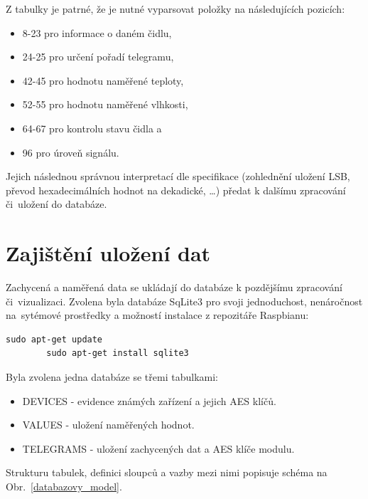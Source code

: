 Z tabulky je patrné, že je nutné vyparsovat položky na následujících pozicích:
\begin{itemize}
	\item 8-23 pro informace o daném čidlu,
	\item 24-25 pro určení pořadí telegramu,
	\item 42-45 pro hodnotu naměřené teploty,
	\item 52-55 pro hodnotu naměřené vlhkosti,
	\item 64-67 pro kontrolu stavu čidla a
	\item 96 pro úroveň signálu.	
\end{itemize}

Jejich následnou správnou interpretací dle specifikace (zohlednění uložení LSB, převod hexadecimálních hodnot na dekadické, \ldots) předat k dalšímu zpracování či~uložení do databáze.


\section{Zajištění uložení dat}
\label{SectionUlozeniDatabaze}
Zachycená a naměřená data se ukládají do databáze k pozdějšímu zpracování či~vizualizaci. Zvolena byla databáze SqLite3 pro svoji jednoduchost, nenáročnost na~sytémové prostředky a možností instalace z repozitáře Raspbianu:
 
\begin{lstlisting}[style=MyCodeBash]
		sudo apt-get update
		sudo apt-get install sqlite3
	\end{lstlisting}

Byla zvolena jedna databáze se třemi tabulkami:
\begin{itemize}
	\item DEVICES - evidence známých zařízení a jejich AES klíčů.
	\item VALUES - uložení naměřených hodnot.
	\item TELEGRAMS - uložení zachycených dat a AES klíče modulu.
\end{itemize}

Strukturu tabulek, definici sloupců a vazby mezi nimi popisuje schéma na Obr.~\ref{databazovy_model}.

